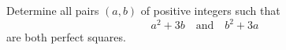 Determine all pairs $(a,b)$ of positive integers such that
$$a^2 + 3b \quad \text{and} \quad b^2 + 3a$$
are both perfect squares.